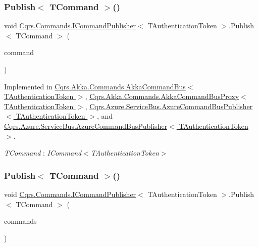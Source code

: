 \subsubsection{\texorpdfstring{Publish$<$ T\+Command $>$()}{Publish< TCommand >()}\hspace{0.1cm}{\footnotesize\ttfamily [1/2]}}
{\footnotesize\ttfamily void \hyperlink{interfaceCqrs_1_1Commands_1_1ICommandPublisher}{Cqrs.\+Commands.\+I\+Command\+Publisher}$<$ T\+Authentication\+Token $>$.Publish$<$ T\+Command $>$ (\begin{DoxyParamCaption}\item[{T\+Command}]{command }\end{DoxyParamCaption})}



Implemented in \hyperlink{classCqrs_1_1Akka_1_1Commands_1_1AkkaCommandBus_a48e1d46035b1e1a3251636b8a03f7dae}{Cqrs.\+Akka.\+Commands.\+Akka\+Command\+Bus$<$ T\+Authentication\+Token $>$}, \hyperlink{classCqrs_1_1Akka_1_1Commands_1_1AkkaCommandBusProxy_a410c0fe52016d04de950b1ae767d2ccb}{Cqrs.\+Akka.\+Commands.\+Akka\+Command\+Bus\+Proxy$<$ T\+Authentication\+Token $>$}, \hyperlink{classCqrs_1_1Azure_1_1ServiceBus_1_1AzureCommandBusPublisher_aefdaed600f88cc645a1b7ab41db42a69}{Cqrs.\+Azure.\+Service\+Bus.\+Azure\+Command\+Bus\+Publisher$<$ T\+Authentication\+Token $>$}, and \hyperlink{classCqrs_1_1Azure_1_1ServiceBus_1_1AzureCommandBusPublisher_aefdaed600f88cc645a1b7ab41db42a69}{Cqrs.\+Azure.\+Service\+Bus.\+Azure\+Command\+Bus\+Publisher$<$ T\+Authentication\+Token $>$}.

\begin{Desc}
\item[Type Constraints]\begin{description}
\item[{\em T\+Command} : {\em I\+Command$<$T\+Authentication\+Token$>$}]\end{description}
\end{Desc}
\mbox{\label{interfaceCqrs_1_1Commands_1_1ICommandPublisher_af0f033c0b949e5650032e4f00b11b595}} 
\subsubsection{\texorpdfstring{Publish$<$ T\+Command $>$()}{Publish< TCommand >()}\hspace{0.1cm}{\footnotesize\ttfamily [2/2]}}
{\footnotesize\ttfamily void \hyperlink{interfaceCqrs_1_1Commands_1_1ICommandPublisher}{Cqrs.\+Commands.\+I\+Command\+Publisher}$<$ T\+Authentication\+Token $>$.Publish$<$ T\+Command $>$ (\begin{DoxyParamCaption}\item[{I\+Enumerable$<$ T\+Command $>$}]{commands }\end{DoxyParamCaption})}



